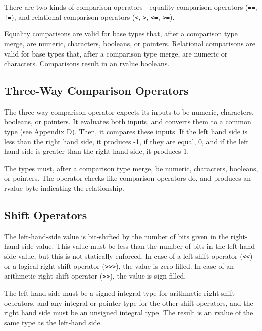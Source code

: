 \documentclass[letterpaper,12pt]{book}
\begin{document}


There are two kinds of comparison operators - equality comparison operators (\texttt{==}, \texttt{!=}), and relational comparison operators (\texttt{<}, \texttt{>}, \texttt{<=}, \texttt{>=}).

Equality comparisons are valid for base types that, after a comparison type merge, are numeric, characters, booleans, or pointers. Relational comparisons are valid for base types that, after a comparison type merge, are numeric or characters. Comparisons result in an rvalue booleans.

\subsection{Three-Way Comparison Operators}



The three-way comparison operator expects its inputs to be numeric, characters, booleans, or pointers. It evaluates both inputs, and converts them to a common type (see Appendix D). Then, it compares these inputs. If the left hand side is less than the right hand side, it produces -1, if they are equal, 0, and if the left hand side is greater than the right hand side, it produces 1.

The types must, after a comparison type merge, be numeric, characters, booleans, or pointers. The operator checks like comparison operators do, and produces an rvalue byte indicating the relationship.

\subsection{Shift Operators}



The left-hand-side value is bit-shifted by the number of bits given in the right-hand-side value. This value must be less than the number of bits in the left hand side value, but this is not statically enforced. In case of a left-shift operator (\texttt{<<}) or a logical-right-shift operator (\texttt{>>>}), the value is zero-filled. In case of an arithmetic-right-shift operator (\texttt{>>}), the value is sign-filled.

The left-hand side must be a signed integral type for arithmetic-right-shift oeprators, and any integral or pointer type for the other shift operators, and the right hand side must be an unsigned integral type. The result is an rvalue of the same type as the left-hand side.
\end{document}
